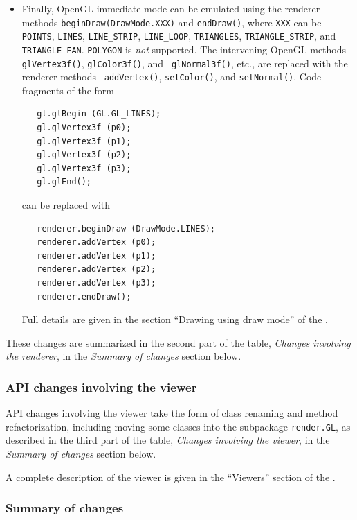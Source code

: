 \documentclass{article}
\begin{document}
\begin{itemize}
\item Finally, OpenGL immediate mode can be emulated using the
renderer methods {\tt beginDraw(DrawMode.XXX)} and {\tt endDraw()},
where {\tt XXX} can be {\tt POINTS}, {\tt LINES}, {\tt LINE\_STRIP},
{\tt LINE\_LOOP}, {\tt TRIANGLES}, {\tt TRIANGLE\_STRIP}, and {\tt
TRIANGLE\_FAN}. {\tt POLYGON} is {\it not} supported. The intervening
OpenGL methods {\tt glVertex3f()}, {\tt glColor3f()}, and {\tt
glNormal3f()}, etc., are replaced with the renderer methods {\tt
addVertex()}, {\tt setColor()}, and {\tt setNormal()}.
Code fragments of the form
%
\begin{verbatim}
   gl.glBegin (GL.GL_LINES);
   gl.glVertex3f (p0);
   gl.glVertex3f (p1);
   gl.glVertex3f (p2);
   gl.glVertex3f (p3);
   gl.glEnd();
\end{verbatim}
can be replaced with
\begin{verbatim}
   renderer.beginDraw (DrawMode.LINES);
   renderer.addVertex (p0);
   renderer.addVertex (p1);
   renderer.addVertex (p2);
   renderer.addVertex (p3);
   renderer.endDraw();
\end{verbatim}
Full details are given in the section
``Drawing using draw mode'' of the
.

\end{itemize}

These changes are summarized in the second part of the table, {\it Changes
involving the renderer}, in the {\it Summary of changes} section below.

\subsubsection*{API changes involving the viewer}

API changes involving the viewer take the form of class renaming and
method refactorization, including moving some classes into the
subpackage {\tt render.GL}, as described in the third part of the table, {\it
Changes involving the viewer}, in the {\it Summary of
changes} section below.

A complete description of the viewer is
given in the ``Viewers'' section of the
.

\subsubsection*{Summary of changes}
\end{document}
